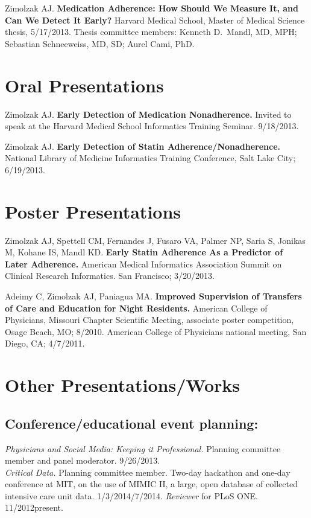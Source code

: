 \documentclass[12pt]{article}
\begin{document}
Zimolzak AJ. \textbf{Medication Adherence: How Should We Measure It, and Can
We Detect It Early?} Harvard Medical School, Master of Medical Science
thesis, 5/17/2013. Thesis committee members: Kenneth D.\ Mandl, MD,
MPH; Sebastian Schneeweiss, MD, SD; Aurel Cami, PhD.

\section*{Oral Presentations}

Zimolzak AJ. \textbf{Early Detection of Medication Nonadherence.}
Invited to speak at the Harvard Medical School Informatics Training
Seminar. 9/18/2013.

Zimolzak AJ. \textbf{Early Detection of Statin
  Adherence/Nonadherence.} National Library of Medicine Informatics
Training Conference, Salt Lake City; 6/19/2013.

\section*{Poster Presentations}

Zimolzak AJ, Spettell CM, Fernandes J, Fusaro VA, Palmer NP, Saria S,
Jonikas M, Kohane IS, Mandl KD. \textbf{Early Statin
  Adherence As a Predictor of Later Adherence.} American Medical
Informatics Association Summit on Clinical Research Informatics. San
Francisco; 3/20/2013.

Adeimy C, Zimolzak AJ, Paniagua MA. \textbf{Improved Supervision of
  Transfers of Care and Education for Night Residents.} American
College of Physicians, Missouri Chapter Scientific Meeting, associate
poster competition, Osage Beach, MO; 8/2010. American College of
Physicians national meeting, San Diego, CA; 4/7/2011.

\section*{Other Presentations/Works}

\subsection*{Conference/educational event planning:}
\emph{Physicians and Social Media: Keeping it Professional.} Planning
committee member and panel moderator. 9/26/2013.\\
\emph{Critical Data.} Planning committee member. Two-day hackathon and
one-day conference at MIT, on the use of MIMIC II, a large, open
database of collected intensive care unit data.
1/3/2014\ndash{}/7/2014.
\emph{Reviewer} for PLoS ONE. 11/2012\ndash{}present.
\end{document}
